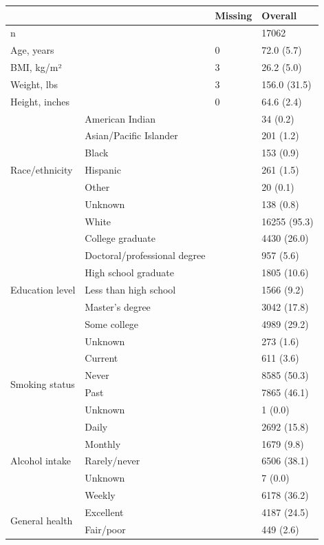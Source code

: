 \begin{tabular}{llll}
\toprule
 &  & Missing & Overall \\
\midrule
n &  &  & 17062 \\
\cline{1-4}
Age, years &  & 0 & 72.0 (5.7) \\
\cline{1-4}
BMI, kg/m² &  & 3 & 26.2 (5.0) \\
\cline{1-4}
Weight, lbs &  & 3 & 156.0 (31.5) \\
\cline{1-4}
Height, inches &  & 0 & 64.6 (2.4) \\
\cline{1-4}
\multirow[t]{7}{*}{Race/ethnicity} & American Indian &  & 34 (0.2) \\
 & Asian/Pacific Islander &  & 201 (1.2) \\
 & Black &  & 153 (0.9) \\
 & Hispanic &  & 261 (1.5) \\
 & Other &  & 20 (0.1) \\
 & Unknown &  & 138 (0.8) \\
 & White &  & 16255 (95.3) \\
\cline{1-4}
\multirow[t]{7}{*}{Education level} & College graduate &  & 4430 (26.0) \\
 & Doctoral/professional degree &  & 957 (5.6) \\
 & High school graduate &  & 1805 (10.6) \\
 & Less than high school &  & 1566 (9.2) \\
 & Master's degree &  & 3042 (17.8) \\
 & Some college &  & 4989 (29.2) \\
 & Unknown &  & 273 (1.6) \\
\cline{1-4}
\multirow[t]{4}{*}{Smoking status} & Current &  & 611 (3.6) \\
 & Never &  & 8585 (50.3) \\
 & Past &  & 7865 (46.1) \\
 & Unknown &  & 1 (0.0) \\
\cline{1-4}
\multirow[t]{5}{*}{Alcohol intake} & Daily &  & 2692 (15.8) \\
 & Monthly &  & 1679 (9.8) \\
 & Rarely/never &  & 6506 (38.1) \\
 & Unknown &  & 7 (0.0) \\
 & Weekly &  & 6178 (36.2) \\
\cline{1-4}
\multirow[t]{5}{*}{General health} & Excellent &  & 4187 (24.5) \\
 & Fair/poor &  & 449 (2.6) \\

\end{tabular}
